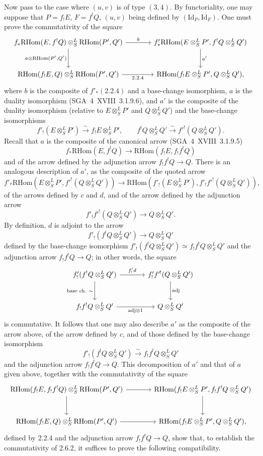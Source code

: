 \documentclass[11pt]{article}
\providecommand{\RHom}{\mathrm{RHom}}
\providecommand{\Id}{\mathrm{Id}}
\providecommand{\RHom}{\mathrm{RHom}}
\providecommand{\RHom}{\mathrm R\mathcal{H}om}
\begin{document}
Now pass to the case where $(u,v)$ is of type $(3,4)$. By functoriality, one may suppose that $P=f_{!}E$, $F=f^{!}Q$, $(u,v)$ being defined by $(\Id_P,\Id_F)$. One must prove the commutativity of the square
\[
\begin{tikzcd}[column sep=large,row sep=large]
f_*\RHom(E,f^!Q)\otimes^L_S\RHom(P',Q') \arrow[r,"b"] \arrow[d,"{a\otimes\RHom(P',Q')}"'] & f'_*\RHom(E\otimes^L_SP',f^!Q\otimes^L_SQ') \arrow[d,"a'"]\\
\RHom(f_!E,Q)\otimes^L_S\RHom(P',Q') \arrow[r,"2.2.4"'] & \RHom(f_!E\otimes^L_SP',Q\otimes^L_SQ'),
\end{tikzcd}
\]
where $b$ is the composite of $f'_*(2.2.4)$ and a base-change isomorphism, $a$ is the duality isomorphism (SGA~4~XVIII~3.1.9.6), and $a'$ is the composite of the duality isomorphism (relative to $E\otimes^L_SP'$ and $Q\otimes^L_SQ'$) and the base-change isomorphisms
\[
f'_!(E\otimes^L_SP')\xrightarrow{\sim}f_!E\otimes^L_SP',
\qquad
f^!Q\otimes^L_SQ'\xrightarrow{\sim}f'^!(Q\otimes^L_SQ').
\]
Recall that $a$ is the composite of the canonical arrow (SGA~4~XVIII~3.1.9.5)
\[
f_*\RHom(E,f^!Q)\longrightarrow\RHom(f_!E,f_!f^!Q)
\]
and of the arrow defined by the adjunction arrow $f_!f^!Q\to Q$. There is an analogous description of $a'$, as the composite of the quoted arrow
\[
f'_*\RHom(E\otimes^L_SP',f'^!(Q\otimes^L_SQ'))\longrightarrow
\RHom(f'_!(E\otimes^L_SP'),f'_!f'^!(Q\otimes^L_SQ')),
\]
of the arrows defined by $c$ and $d$, and of the arrow defined by the adjunction arrow
\[
f'_!f'^!(Q\otimes^L_SQ')\longrightarrow Q\otimes^L_SQ'.
\]
By definition, $d$ is adjoint to the arrow
\[
f'_!(f^!Q\otimes^L_SQ')\longrightarrow Q\otimes^L_SQ'
\]
defined by the base-change isomorphism $f'_!(f^!Q\otimes^L_SQ')\simeq f_!f^!Q\otimes^L_SQ'$ and the adjunction arrow $f_!f^!Q\to Q$; in other words, the square
\[
\begin{tikzcd}[column sep=large,row sep=large]
f'_!(f^!Q\otimes^L_SQ') \arrow[r,"{f'_!d}"] \arrow[d,"{\text{base ch.}\ \sim}"'] & f'_!f'^!(Q\otimes^L_SQ') \arrow[d,"\mathrm{adj}"]\\
f_!f^!Q\otimes^L_SQ' \arrow[r,"{\mathrm{adj}\otimes 1}"'] & Q\otimes^L_SQ'
\end{tikzcd}
\]
is commutative. It follows that one may also describe $a'$ as the composite of the arrow above, of the arrow defined by $c$, and of those defined by the base-change isomorphism
\[
f'_!(f^!Q\otimes^L_SQ')\xrightarrow{\sim}f_!f^!Q\otimes^L_SQ'
\]
and the adjunction arrow $f_!f^!Q\to Q$. This decomposition of $a'$ and that of $a$ given above, together with the commutativity of the square
\[
\begin{tikzcd}[column sep=large,row sep=large]
\RHom(f_!E,f_!f^!Q)\otimes^L_S\RHom(P',Q') \arrow[r] \arrow[d] & \RHom(f_!E\otimes^L_SP',f_!f^!Q\otimes^L_SQ') \arrow[d]\\
\RHom(f_!E,Q)\otimes^L_S\RHom(P',Q') \arrow[r] & \RHom(f_!E\otimes^L_SP',Q\otimes^L_SQ'),
\end{tikzcd}
\]
defined by 2.2.4 and the adjunction arrow $f_!f^!Q\to Q$, show that, to establish the commutativity of 2.6.2, it suffices to prove the following compatibility.
\end{document}
